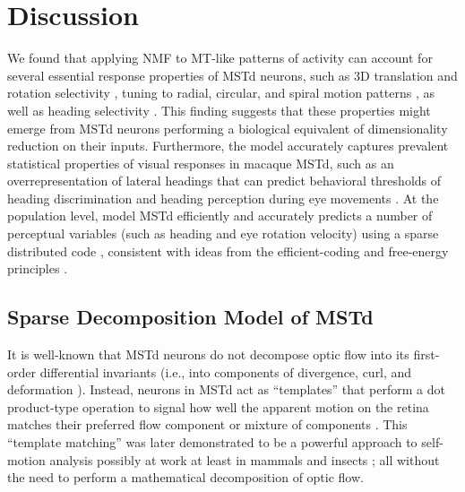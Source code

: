 \section{Discussion}
We found that applying \ac{NMF} \citep{PaateroTapper1994,LeeSeung1999,LeeSeung2001}
to \ac{MT}-like patterns of activity can account for several essential response properties
of \ac{MSTd} neurons, such as 3D translation and rotation selectivity 
\citep{Gu2006,Takahashi2007}, tuning to radial, circular, and spiral motion patterns
\citep{Graziano1994,Lagae1994,DuffyWurtz1995}, as well as heading selectivity
\citep{PageDuffy1999,BenHamed2003,PageDuffy2003}.
This finding suggests that these properties might emerge from \ac{MSTd} neurons 
performing a biological equivalent of dimensionality reduction on their inputs. 
Furthermore, the model accurately captures prevalent statistical properties of 
visual responses in macaque \ac{MSTd}, such as an overrepresentation of lateral headings
\citep{Lappe1996,Gu2006,Takahashi2007,Gu2010} that can predict behavioral thresholds
of heading discrimination \citep{Gu2010} and heading perception during eye movements
\citep{Royden1994}. At the population level, model \ac{MSTd} efficiently and accurately
predicts a number of perceptual variables (such as heading and eye rotation velocity) 
using a sparse distributed code \citep{OlshausenField1996,OlshausenField1997,BenHamed2003},
consistent with ideas from the efficient-coding and free-energy principles
\citep{Attneave1954,Barlow1961,Linsker1990,SimoncelliOlshausen2001,Friston2006,Friston2010}.

\subsection{Sparse Decomposition Model of MSTd}
\label{sec:MSTd|discussion|model}
It is well-known that \ac{MSTd} neurons do not decompose optic flow into its first-order
differential invariants (i.e., into components of divergence, curl, and deformation
\citep{KoenderinkVanDoorn1975}). Instead, neurons in \ac{MSTd} act as  ``templates''
\citep{Perrone1992} that perform a dot product-type operation to signal how well the 
apparent motion on the retina matches their preferred flow component 
or mixture of components \citep{Saito1986,Tanaka1989,Orban1992}.
This ``template matching'' was later demonstrated to be a powerful approach to 
self-motion analysis possibly at work at least in mammals 
\citep{LappeRauschecker1994,PerroneStone1994,PerroneStone1998} and insects
\citep{KrappHengstenberg1996,Srinivasan1996,Krapp2000}; all without the need to perform
a mathematical decomposition of optic flow.

